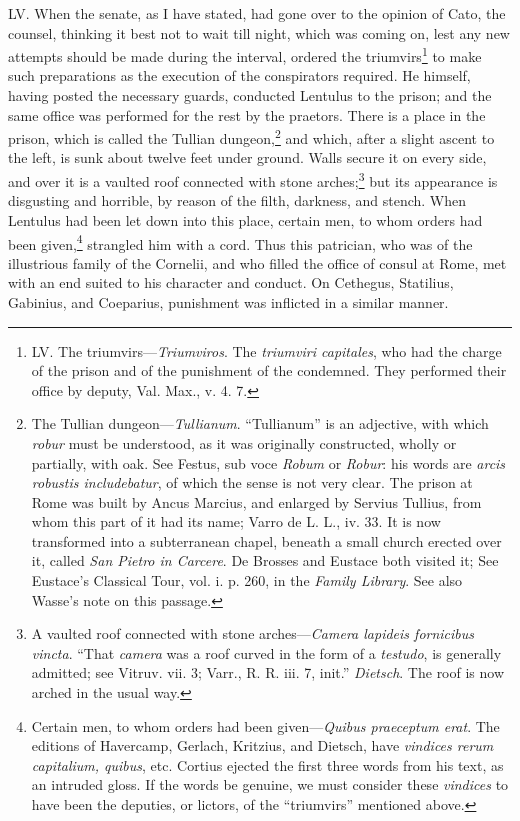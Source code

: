 LV. When the senate, as I have stated, had gone over to the opinion of
Cato, the counsel, thinking it best not to wait till night, which was
coming on, lest any new attempts should be made during the interval,
ordered the triumvirs\footnote{LV. The triumvirs—\emph{Triumviros}. The \emph{triumviri capitales},
who had the charge of the prison and of the punishment of the
condemned. They performed their office by deputy, Val. Max., v. 4. 7.} to make such preparations as the execution
of the conspirators required. He himself, having posted the necessary
guards, conducted Lentulus to the prison; and the same office was
performed for the rest by the praetors. There is a place in the
prison, which is called the Tullian dungeon,\footnote{The Tullian dungeon—\emph{Tullianum}. ``Tullianum'' is an adjective,
with which \emph{robur} must be understood, as it was originally
constructed, wholly or partially, with oak. See Festus, sub voce
\emph{Robum} or \emph{Robur}: his words are \emph{arcis robustis includebatur}, of
which the sense is not very clear. The prison at Rome was built by
Ancus Marcius, and enlarged by Servius Tullius, from whom this part of
it had its name; Varro de L. L., iv. 33. It is now transformed into a
subterranean chapel, beneath a small church erected over it, called
\emph{San Pietro in Carcere}. De Brosses and Eustace both visited it; See
Eustace's Classical Tour, vol. i. p. 260, in the \emph{Family Library}. See
also Wasse's note on this passage.} and which, after a
slight ascent to the left, is sunk about twelve feet under ground.
Walls secure it on every side, and over it is a vaulted roof connected
with stone arches;\footnote{A vaulted roof connected with stone arches—\emph{Camera lapideis
fornicibus vincta}. ``That \emph{camera} was a roof curved in the form of
a \emph{testudo}, is generally admitted; see Vitruv. vii. 3; Varr.,
R. R. iii. 7, init.'' \emph{Dietsch}. The roof is now arched in the usual
way.} but its appearance is disgusting and horrible,
by reason of the filth, darkness, and stench. When Lentulus had been
let down into this place, certain men, to whom orders had been
given,\footnote{Certain men, to whom orders had been given—\emph{Quibus praeceptum
erat}. The editions of Havercamp, Gerlach, Kritzius, and Dietsch,
have \emph{vindices rerum capitalium, quibus}, etc. Cortius ejected the
first three words from his text, as an intruded gloss. If the words
be genuine, we must consider these \emph{vindices} to have been the
deputies, or lictors, of the ``triumvirs'' mentioned above.} strangled him with a cord. Thus this patrician, who was of
the illustrious family of the Cornelii, and who filled the office of
consul at Rome, met with an end suited to his character and conduct.
On Cethegus, Statilius, Gabinius, and Coeparius, punishment was
inflicted in a similar manner.

